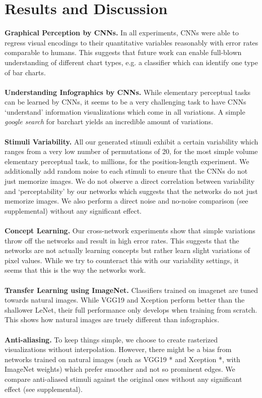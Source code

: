 \section{Results and Discussion}

\textbf{Graphical Perception by CNNs.} In all experiments, CNNs were able to regress visual encodings to their quantitative variables reasonably with error rates comparable to humans. This suggests that future work can enable full-blown understanding of different chart types, e.g. a classifier which can identify one type of bar charts.
\\~\\
\textbf{Understanding Infographics by CNNs.} While elementary perceptual tasks can be learned by CNNs, it seems to be a very challenging task to have CNNs `understand' information visualizations which come in all variations. A simple \textit{google search} for barchart yields an incredible amount of variations.
\\~\\
\textbf{Stimuli Variability.} All our generated stimuli exhibit a certain variability which ranges from a very low number of permutations of 20, for the most simple volume elementary perceptual task, to millions, for the position-length experiment. We additionally add random noise to each stimuli to ensure that the CNNs do not just memorize images. We do not observe a direct correlation between variability and `perceptability' by our networks which suggests that the networks do not just memorize images. We also perform a direct noise and no-noise comparison (see supplemental) without any significant effect.
\\~\\
\textbf{Concept Learning.} Our cross-network experiments show that simple variations throw off the networks and result in high error rates. This suggests that the networks are not actually learning concepts but rather learn slight variations of pixel values. While we try to counteract this with our variability settings, it seems that this is the way the networks work.
\\~\\
\textbf{Transfer Learning using ImageNet.} Classifiers trained on imagenet are tuned towards natural images. While VGG19 and Xception perform better than the shallower LeNet, their full performance only develops when training from scratch. This shows how natural images are truely different than infographics.
\\~\\
\textbf{Anti-aliasing.} To keep things simple, we choose to create rasterized visualizations without interpolation. However, there might be a bias from networks trained on natural images (such as VGG19 * and Xception *, with ImageNet weights) which prefer smoother and not so prominent edges. We compare anti-aliased stimuli against the original ones without any significant effect (see supplemental). 
